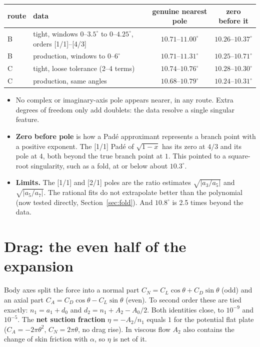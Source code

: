 \documentclass[11pt,a4paper]{article}
\newcommand{\CL}{C_L}
\newcommand{\CD}{C_D}
\newcommand{\CN}{C_N}
\newcommand{\CA}{C_A}
\begin{document}
\begin{center}\small
\begin{tabular}{llcc}
\toprule
route & data & genuine nearest pole & zero before it\\
\midrule
B & tight, windows $0$--$3.5^\circ$ to $0$--$4.25^\circ$, orders [1/1]--[4/3] & $10.71$--$11.00^\circ$ & $10.26$--$10.37^\circ$\\
B & production, windows to $0$--$6^\circ$ & $10.71$--$11.31^\circ$ & $10.25$--$10.71^\circ$\\
C & tight, loose tolerance (2--4 terms) & $10.74$--$10.76^\circ$ & $10.28$--$10.30^\circ$\\
C & production, same angles & $10.68$--$10.79^\circ$ & $10.24$--$10.31^\circ$\\
\bottomrule
\end{tabular}
\end{center}

\begin{itemize}[leftmargin=*]
\item No complex or imaginary-axis pole appears nearer, in any route. Extra degrees of freedom only add
  doublets: the data resolve a single singular feature.
\item \textbf{Zero before pole} is how a Padé approximant represents a branch point with a positive
  exponent. The [1/1] Padé of $\sqrt{1-x}$ has its zero at $4/3$ and its pole at $4$, both beyond the true
  branch point at $1$. This pointed to a square-root singularity, such as a fold, at or below about
  $10.3^\circ$.
\item \textbf{Limits.} The [1/1] and [2/1] poles are the ratio estimates $\sqrt{|a_3/a_5|}$ and
  $\sqrt{|a_5/a_7|}$. The rational fits do not extrapolate better than the polynomial (now tested
  directly, Section~\ref{sec:fold}). And $10.8^\circ$ is 2.5 times beyond the data.
\end{itemize}

\section{Drag: the even half of the expansion}\label{sec:drag}

Body axes split the force into a normal part $\CN = \CL\cos\theta + \CD\sin\theta$ (odd) and an axial
part $\CA = \CD\cos\theta - \CL\sin\theta$ (even). To second order these are tied exactly:
$n_1 = a_1 + d_0$ and $d_2 = n_1 + A_2 - A_0/2$. Both identities close, to $10^{-9}$ and $10^{-5}$. The
\textbf{net suction fraction} $\eta = -A_2/n_1$ equals $1$ for the potential flat plate
($\CA=-2\pi\theta^2$, $\CN=2\pi\theta$, no drag rise). In viscous flow $A_2$ also contains the change of
skin friction with $\alpha$, so $\eta$ is net of it.
\end{document}
